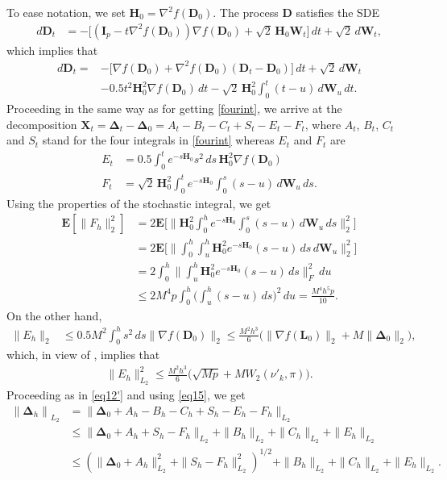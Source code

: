 \documentclass[aoap,preprint,reqno,a4paper]{imsart} %
\newcommand{\bDelta}{\boldsymbol{\Delta}}
\newcommand{\bfE}{\mathbf E}
\newcommand{\bfH}{\mathbf H}
\newcommand{\bfI}{\mathbf I}
\newcommand{\bW}{\boldsymbol W\!}
\newcommand{\bD}{\boldsymbol D}
\newcommand{\bL}{\boldsymbol L}
\newcommand{\bX}{\boldsymbol X}
\begin{document}
To ease notation, we set $\bfH_0 = \nabla^2 f(\bD_0)$. The process $\bD$ satisfies the SDE
\begin{align}\label{SDE2}
d\bD_t &= -\big[(\bfI_p-t\nabla^2 f(\bD_0))\nabla f(\bD_0) + \sqrt{2}\,\bfH_0\bW_t\big]\,dt+\sqrt{2}\,d\bW_t,
\end{align}
which implies that
\begin{align}\label{SDE3}
d\bD_t = &-\big[\nabla f(\bD_0) + \nabla^2 f(\bD_0)(\bD_t-\bD_0)\big]\,dt +\sqrt{2}\,d\bW_t\\
&-0.5 t^2\bfH_0^2\nabla f(\bD_0)\,dt - \sqrt{2}\,\bfH_0^2\int_0^t (t-u)\,d\bW_{u}\,dt.
\end{align}
Proceeding in the same way as for getting \eqref{fourint}, we arrive at the decomposition
$\bX_t = \bDelta_t-\bDelta_0 = A_t-B_t-C_t+S_t - E_t-F_t$,
where $A_t$, $B_t$, $C_t$ and $S_t$ stand for the four integrals in \eqref{fourint} whereas $E_t$ and $F_t$
are
\begin{align}
E_t &= 0.5\int_0^t  e^{-s\bfH_0}  s^2\, ds\,\bfH_0^2\nabla f(\bD_0)\\
F_t &= \sqrt{2}\,\bfH_0^2\int_0^t e^{-s\bfH_0} \int_0^s (s-u) \,d\bW_u\, ds.
\end{align}
Using the properties of the stochastic integral, we get
\begin{align}
\bfE[\|F_h\|_2^2]
		&= 2\bfE\Big[\Big\|\bfH_0^2\int_0^h e^{-s\bfH_0} \int_0^s (s-u) \,d\bW_u\, ds\Big\|_2^2\Big]\\
		&= 2\bfE\Big[\Big\|\int_0^h \int_u^h \bfH_0^2e^{-s\bfH_0} (s-u)\,ds\,d\bW_u\Big\|_2^2\Big]\\
		&= 2\int_0^h\Big\|\int_u^h \bfH_0^2e^{-s\bfH_0} (s-u)\,ds\Big\|_F^2\,du\\
		&\le 2M^4p \int_0^h\Big(\int_u^h (s-u)\,ds\Big)^2\,du = \frac{M^4h^5p}{10}.\label{Ft}
\end{align}
On the other hand,
\begin{align}
\|E_h\|_2
		&\le 0.5M^2\int_0^hs^2\,ds\|\nabla f(\bD_0)\|_2
		\le \frac{M^2h^3}{6}\big(\|\nabla f(\bL_0)\|_2+M\|\bDelta_0\|_2\big),
\end{align}
which, in view of , implies that
\begin{align}
\|E_h\|_{L_2}^2
		\le \frac{M^2h^3}{6}\big(\sqrt{Mp}+M W_2(\nu'_k,\pi)\big).\label{Et}
\end{align}
Proceeding as in \eqref{eq12'} and using \eqref{eq15}, we get
\begin{align}
{\|\bDelta_h\|}_{L_2}
		& = \|\bDelta_0+A_h-B_h-C_h+S_h-E_h-F_h\|_{L_2} \\
		&\le \|\bDelta_0+A_h+S_h-F_h\|_{L_2} + \|B_h\|_{L_2} + \|C_h\|_{L_2}  +\|E_h\|_{L_2}\\
		&\le (\|\bDelta_0+A_h\|_{L_2}^2 +\|S_h-F_h\|_{L_2}^2)^{1/2} + \|B_h\|_{L_2} + \|C_h\|_{L_2}
				+ \|E_h\|_{L_2}.\label{decomp3}
\end{align}
\end{document}
